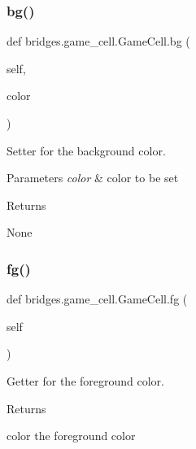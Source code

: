 \subsubsection{\texorpdfstring{bg()}{bg()}\hspace{0.1cm}{\footnotesize\ttfamily [2/2]}}
{\footnotesize\ttfamily def bridges.\+game\+\_\+cell.\+Game\+Cell.\+bg (\begin{DoxyParamCaption}\item[{}]{self,  }\item[{}]{color }\end{DoxyParamCaption})}



Setter for the background color. 


\begin{DoxyParams}{Parameters}
{\em color} & color to be set \\
\hline
\end{DoxyParams}
\begin{DoxyReturn}{Returns}


None 
\end{DoxyReturn}
\mbox{\label{classbridges_1_1game__cell_1_1_game_cell_a351a23a7e0c4a8b026ab95bff6c05e35}} 
\subsubsection{\texorpdfstring{fg()}{fg()}\hspace{0.1cm}{\footnotesize\ttfamily [1/2]}}
{\footnotesize\ttfamily def bridges.\+game\+\_\+cell.\+Game\+Cell.\+fg (\begin{DoxyParamCaption}\item[{}]{self }\end{DoxyParamCaption})}



Getter for the foreground color. 

\begin{DoxyReturn}{Returns}


color the foreground color 
\end{DoxyReturn}
\mbox{\label{classbridges_1_1game__cell_1_1_game_cell_ae49f154ef62b58e70c06b6a1da230acc}} 
